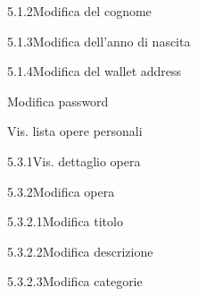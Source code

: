 \begin{usecase}{5.1.2}{Modifica del cognome}
	\usecasepre{}
	\usecasedesc{}
	\usecasepost{}
\end{usecase}

\begin{usecase}{5.1.3}{Modifica dell'anno di nascita}
	\usecasepre{}
	\usecasedesc{}
	\usecasepost{}
\end{usecase}

\begin{usecase}{5.1.4}{Modifica del wallet address}
	\usecasepre{}
	\usecasedesc{}
	\usecasepost{}
\end{usecase}

\begin{usecase}{5.2}{Modifica password}
	\usecasepre{}
	\usecasedesc{}
	\usecasepost{}
\end{usecase}

\begin{usecase}{5.3}{Vis. lista opere personali}
	\usecasepost{}
\end{usecase}

\begin{usecase}{5.3.1}{Vis. dettaglio opera}
	\usecasepre{}
	\usecasedesc{}
	\usecasepost{}
\end{usecase}

\begin{usecase}{5.3.2}{Modifica opera}
	\usecasepre{}
	\usecasedesc{}
	\usecasepost{}
\end{usecase}

\begin{usecase}{5.3.2.1}{Modifica titolo}
	\usecasepre{}
	\usecasedesc{}
	\usecasepost{}
\end{usecase}

\begin{usecase}{5.3.2.2}{Modifica descrizione}
	\usecasepre{}
	\usecasedesc{}
	\usecasepost{}
\end{usecase}

\begin{usecase}{5.3.2.3}{Modifica categorie}
	\usecasepre{}
	\usecasedesc{}
	\usecasepost{}
\end{usecase}

